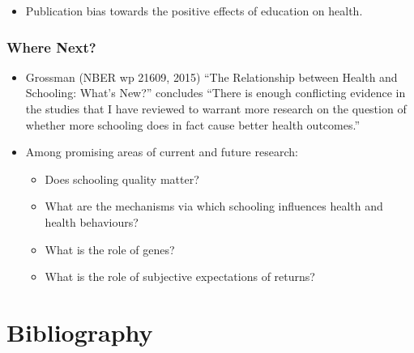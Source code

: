 \begin{itemize}
    \item Publication bias towards the positive effects of education on health.
\end{itemize}

\subsubsection{Where Next?}
\begin{itemize}
    \item Grossman (NBER wp 21609, 2015) “The Relationship between Health and Schooling: What’s New?” concludes “There is enough conflicting evidence in the studies that I have reviewed to warrant more research on the question of whether more schooling does in fact cause better health outcomes.”
    \item Among promising areas of current and future research:
    \begin{itemize}
    \item Does schooling quality matter?
    \item What are the mechanisms via which schooling influences health and health behaviours?
    \item What is the role of genes?
    \item What is the role of subjective expectations of returns?
    \end{itemize}
\end{itemize}


\section*{Bibliography}


